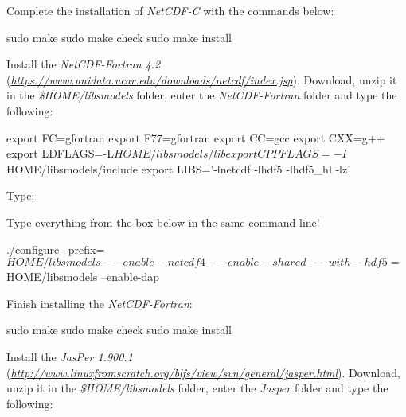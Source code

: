 \noindent Complete the installation of \textit{NetCDF-C} with the commands below:
\bigskip

\begin{bashcode}
sudo make
sudo make check
sudo make install
\end{bashcode}
\bigskip

\noindent Install the \textit{NetCDF-Fortran 4.2} (\textcolor{bleu_cite}{\href{https://www.unidata.ucar.edu/downloads/netcdf/index.jsp}{\textit{https://www.unidata.ucar.edu/downloads/netcdf/index.jsp}}}). 
Download, unzip it in the \textit{\$HOME/libsmodels} folder, enter the \textit{NetCDF-Fortran} folder and type the following:
\bigskip

\begin{bashcode}[fontsize=\scriptsize]
export FC=gfortran
export F77=gfortran
export CC=gcc
export CXX=g++
export LDFLAGS=-L$HOME/libsmodels/lib
export CPPFLAGS=-I$HOME/libsmodels/include
export LIBS='-lnetcdf -lhdf5 -lhdf5_hl -lz'
\end{bashcode}
\bigskip

\noindent Type:
\bigskip

\begin{tcolorbox}[enhanced,
    grow to left by   = 0cm,
    grow to right by  = 0cm,
    enlarge top by    = 0cm,
    enlarge bottom by = 0cm,
    tcbox raise base,
    boxrule           = 1.0pt,
    left              = 18mm,
    colframe          = red!50!black,coltext=red!25!black,colback=red!10!white,
    overlay           = {\begin{tcbclipinterior}\fill[red!75!blue!50!white] (frame.south west)
      rectangle node[text=white,font=\sffamily\bfseries\footnotesize,rotate=0] {WARNING} ([xshift=18mm]frame.north west);\end{tcbclipinterior}}]
Type everything from the box below in the same command line!
  \end{tcolorbox}
\bigskip

\begin{bashcode}
./configure --prefix=$HOME/libsmodels --enable-netcdf4 --enable-shared
--with-hdf5=$HOME/libsmodels --enable-dap
\end{bashcode}
\bigskip

\noindent Finish installing the \textit{NetCDF-Fortran}:
\bigskip

\begin{bashcode}
sudo make
sudo make check
sudo make install
\end{bashcode}
\bigskip

\noindent Install the \textit{JasPer 1.900.1} (\textcolor{bleu_cite}{\href{http://www.linuxfromscratch.org/blfs/view/svn/general/jasper.html}{\textit{http://www.linuxfromscratch.org/blfs/view/svn/general/jasper.html}}}). 
Download, unzip it in the \textit{\$HOME/libsmodels} folder, enter the \textit{Jasper} folder and type the following:
\bigskip

